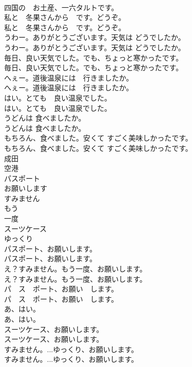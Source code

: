 \documentclass[8pt]{extreport}
\begin{document}
\begin{CJK}{UTF8}{min}
\\	四国の　お土産、一六タルトです。 
\\	私と　冬果さんから　です。どうぞ。	
\\	私と　冬果さんから　です。どうぞ。 
\\	うわー。ありがとうございます。天気は どうでしたか。	
\\	うわー。ありがとうございます。天気は どうでしたか。 
\\	毎日、良い天気でした。でも、ちょっと寒かったです。	
\\	毎日、良い天気でした。でも、ちょっと寒かったです。 
\\	へぇー。道後温泉には　行きましたか。	
\\	へぇー。道後温泉には　行きましたか。 
\\	はい。とても　良い温泉でした。	
\\	はい。とても　良い温泉でした。 
\\	うどんは 食べましたか。	
\\	うどんは 食べましたか。 
\\	もちろん、食べました。安くて すごく美味しかったです。	
\\	もちろん、食べました。安くて すごく美味しかったです。 
\\	成田
\\	空港
\\	パスポート
\\	お願いします
\\	すみません
\\	もう
\\	一度
\\	スーツケース
\\	ゆっくり
\\	パスポート、お願いします。	
\\	パスポート、お願いします。 
\\	え？すみません。もう一度、お願いします。	
\\	え？すみません。もう一度、お願いします。 
\\	パ　ス　ポート、お願い　します。	
\\	パ　ス　ポート、お願い　します。 
\\	あ、はい。	
\\	あ、はい。 
\\	スーツケース、お願いします。	
\\	スーツケース、お願いします。 
\\	すみません。...ゆっくり、お願いします。	
\\	すみません。...ゆっくり、お願いします。 

\end{CJK}
\end{document}
